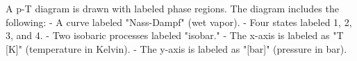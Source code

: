 A p-T diagram is drawn with labeled phase regions. The diagram includes the following:  
- A curve labeled "Nass-Dampf" (wet vapor).  
- Four states labeled 1, 2, 3, and 4.  
- Two isobaric processes labeled "isobar."  
- The x-axis is labeled as "T [K]" (temperature in Kelvin).  
- The y-axis is labeled as "[bar]" (pressure in bar).